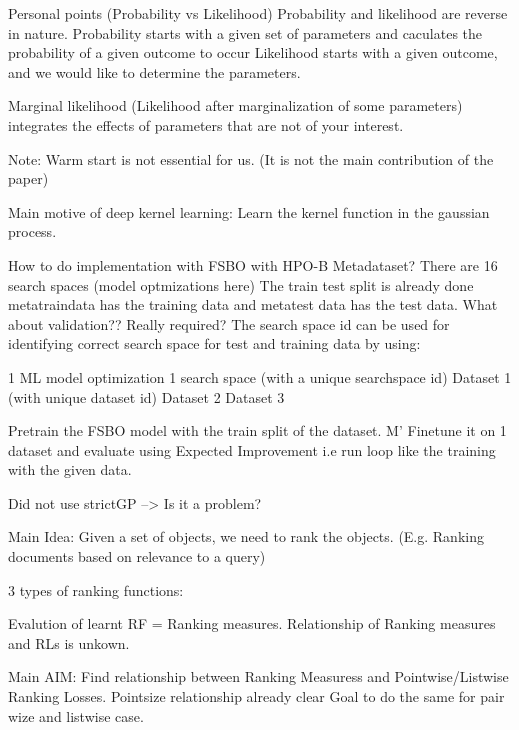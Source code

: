 \documentclass[12pt, twoside, ngerman]{report}
\begin{document}
Personal points (Probability vs Likelihood)
    Probability and likelihood are reverse in nature.
    Probability starts with a given set of parameters and caculates the probability of a given outcome to occur
    Likelihood starts with a given outcome, and we would like to determine the parameters.

    Marginal likelihood (Likelihood after marginalization of some parameters)
        integrates the effects of parameters that are not of your interest.

Note:
    Warm start is not essential for us. (It is not the main contribution of the paper)

Main motive of deep kernel learning:
    Learn the kernel function in the gaussian process.

How to do implementation with FSBO with HPO-B Metadataset?
There are 16 search spaces (model optmizations here)
    The train test split is already done metatraindata has the training data and metatest data has the test data.
    What about validation?? Really required?
    The search space id can be used for identifying correct search space for test and training data by using:

1 ML model optimization
    1 search space (with a unique searchspace id)
        Dataset 1 (with unique dataset id)
        Dataset 2
        Dataset 3

Pretrain the FSBO model with the train split of the dataset. M'
Finetune it on 1 dataset and evaluate using Expected Improvement
    i.e run loop like the training with the given data.

Did not use strictGP --> Is it a problem?
\fi

\iffalse
Main Idea:
    Given a set of objects, we need to rank the objects. (E.g. Ranking documents based on relevance to a query)
    

3 types of ranking functions:


Evalution of learnt RF = Ranking measures.
Relationship of Ranking measures and RLs is unkown.


Main AIM:
    Find relationship between Ranking Measuress and Pointwise/Listwise Ranking Losses.
    Pointsize relationship already clear
    Goal to do the same for pair wize and listwise case.
\end{document}
